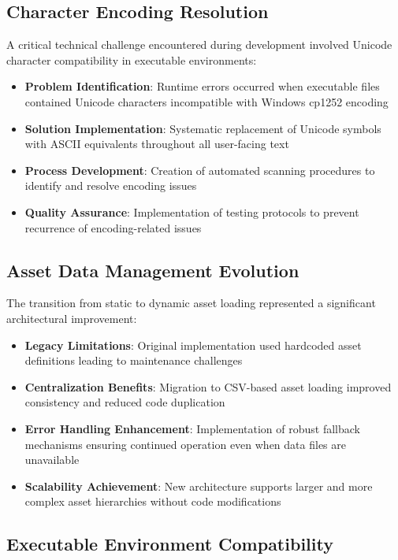 \documentclass[binding=0.6cm]{sapthesis}
\begin{document}
\subsection{Character Encoding Resolution}

A critical technical challenge encountered during development involved Unicode character compatibility in executable environments:

\begin{itemize}
    \item \textbf{Problem Identification}: Runtime errors occurred when executable files contained Unicode characters incompatible with Windows cp1252 encoding
    \item \textbf{Solution Implementation}: Systematic replacement of Unicode symbols with ASCII equivalents throughout all user-facing text
    \item \textbf{Process Development}: Creation of automated scanning procedures to identify and resolve encoding issues
    \item \textbf{Quality Assurance}: Implementation of testing protocols to prevent recurrence of encoding-related issues
\end{itemize}

\subsection{Asset Data Management Evolution}

The transition from static to dynamic asset loading represented a significant architectural improvement:

\begin{itemize}
    \item \textbf{Legacy Limitations}: Original implementation used hardcoded asset definitions leading to maintenance challenges
    \item \textbf{Centralization Benefits}: Migration to CSV-based asset loading improved consistency and reduced code duplication
    \item \textbf{Error Handling Enhancement}: Implementation of robust fallback mechanisms ensuring continued operation even when data files are unavailable
    \item \textbf{Scalability Achievement}: New architecture supports larger and more complex asset hierarchies without code modifications
\end{itemize}

\subsection{Executable Environment Compatibility}
\end{document}
